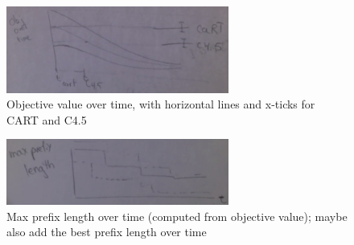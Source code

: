 \begin{figure}[t!]
\begin{center}
\includegraphics[width=0.65\textwidth]{figs/sketch-objective.png}
\end{center}
\caption{Objective value over time,
with horizontal lines and x-ticks for CART and C4.5}
\label{fig:objective}
\end{figure}

\begin{figure}[t!]
\begin{center}
\includegraphics[width=0.65\textwidth]{figs/sketch-max-length.png}
\end{center}
\caption{Max prefix length over time (computed from objective value);
maybe also add the best prefix length over time}
\label{fig:max-length}
\end{figure}

